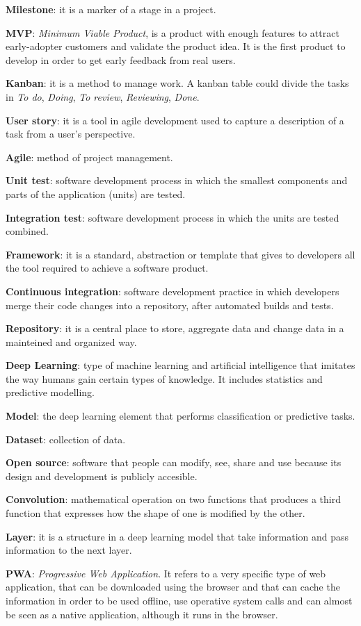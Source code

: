 \textbf{Milestone}: it is a marker of a stage in a project. 
\bigskip

\textbf{MVP}: \textit{Minimum Viable Product}, is a product with enough features to attract early-adopter customers and validate the product idea. It is the first product to develop in order to get early feedback from real users.
\bigskip

\textbf{Kanban}: it is a method to manage work. A kanban table could divide the tasks in \textit{To do}, \textit{Doing}, \textit{To review}, \textit{Reviewing}, \textit{Done}. 
\bigskip

\textbf{User story}: it is a tool in agile development used to capture a description of a task from a user's perspective.
\bigskip

\textbf{Agile}: method of project management.
\bigskip

\textbf{Unit test}: software development process in which the smallest components and parts of the application (units) are tested.
\bigskip

\textbf{Integration test}: software development process in which the units are tested combined.
\bigskip

\textbf{Framework}: it is a standard, abstraction or template that gives to developers all the tool required to achieve a software product.
\bigskip

\textbf{Continuous integration}: software development practice in which developers merge their code changes into a repository, after automated builds and tests.
\bigskip

\textbf{Repository}: it is a central place to store, aggregate data and change data in a mainteined and organized way.
\bigskip

\textbf{Deep Learning}: type of machine learning and artificial intelligence that imitates the way humans gain certain types of knowledge. It includes statistics and predictive modelling.
\bigskip

\textbf{Model}: the deep learning element that performs classification or predictive tasks. 
\bigskip

\textbf{Dataset}: collection of data.
\bigskip

\textbf{Open source}: software that people can modify, see, share and use because its design and development is publicly accesible.
\bigskip

\textbf{Convolution}: mathematical operation on two functions that produces a third function that expresses how the shape of one is modified by the other.
\bigskip

\textbf{Layer}: it is a structure in a deep learning model that take information and pass information to the next layer.
\bigskip

\textbf{PWA}: \textit{Progressive Web Application}. It refers to a very specific type of web application, that can be downloaded using the browser and that can cache the information in order to be used offline, use operative system calls and can almost be seen as a native application, although it runs in the browser.
\bigskip